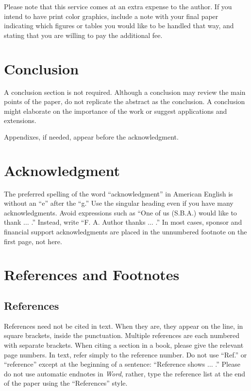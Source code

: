 \documentclass[journal,twoside,web]{ieeecolor2}
\begin{document}
Please note that this service comes at an extra expense to the author.
If 
you intend to have print color graphics, include a note with your final 
paper indicating which figures or tables you would like to be handled that 
way, and stating that you are willing to pay the additional fee.

\section{Conclusion}
A conclusion section is not required.
Although a conclusion may review the 
main points of the paper, do not replicate the abstract as the conclusion.
A 
conclusion might elaborate on the importance of the work or suggest 
applications and extensions.


\appendices

Appendixes, if needed, appear before the acknowledgment.

\section*{Acknowledgment}

The preferred spelling of the word ``acknowledgment'' in American English is 
without an ``e'' after the ``g.'' Use the singular heading even if you have 
many acknowledgments.
Avoid expressions such as ``One of us (S.B.A.) would 
like to thank $\ldots$ .'' Instead, write ``F.
A.
Author thanks $\ldots$ .'' In most 
cases, sponsor and financial support acknowledgments are placed in the 
unnumbered footnote on the first page, not here.

\section*{References and Footnotes}

\subsection{References}
References need not be cited in text.
When they are, they appear on the 
line, in square brackets, inside the punctuation.
Multiple references are 
each numbered with separate brackets.
When citing a section in a book, 
please give the relevant page numbers.
In text, refer simply to the 
reference number.
Do not use ``Ref.'' or ``reference'' except at the 
beginning of a sentence: ``Reference \cite{b3} shows $\ldots$ .'' Please do not use 
automatic endnotes in \emph{Word}, rather, type the reference list at the end of the 
paper using the ``References'' style.
\end{document}
